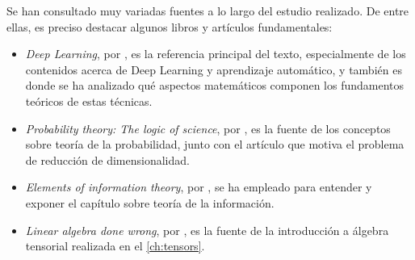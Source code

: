 Se han consultado muy variadas fuentes a lo largo del estudio realizado. De entre ellas, es preciso destacar algunos libros y artículos fundamentales:

\begin{itemize}
\item \emph{Deep Learning}, por \textcite{goodfellow2016}, es la referencia principal del texto, especialmente de los contenidos acerca de Deep Learning y aprendizaje automático, y también es donde se ha analizado qué aspectos matemáticos componen los fundamentos teóricos de estas técnicas.
\item \emph{Probability theory: The logic of science}, por \textcite{jaynes2003}, es la fuente de los conceptos sobre teoría de la probabilidad, junto con el artículo \autocite{beyer1999} que motiva el problema de reducción de dimensionalidad.
\item \emph{Elements of information theory}, por \textcite{coverit}, se ha empleado para entender y exponer el capítulo sobre teoría de la información.
\item \emph{Linear algebra done wrong}, por \textcite{treil2013}, es la fuente de la introducción a álgebra tensorial realizada en el \autoref{ch:tensors}.
\end{itemize}